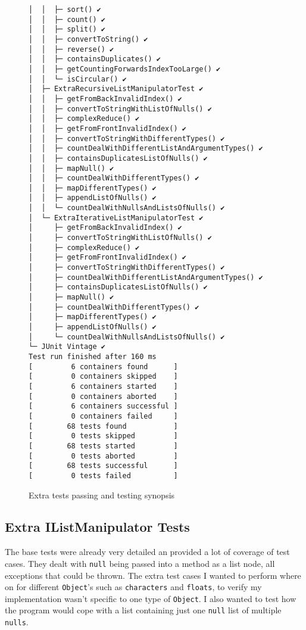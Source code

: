 \documentclass{article}
\begin{document}
\begin{figure}[H]
\centering \begin{BVerbatim}[fontsize=\small]
│  │  ├─ sort() ✔
│  │  ├─ count() ✔
│  │  ├─ split() ✔
│  │  ├─ convertToString() ✔
│  │  ├─ reverse() ✔
│  │  ├─ containsDuplicates() ✔
│  │  ├─ getCountingForwardsIndexTooLarge() ✔
│  │  └─ isCircular() ✔
│  ├─ ExtraRecursiveListManipulatorTest ✔
│  │  ├─ getFromBackInvalidIndex() ✔
│  │  ├─ convertToStringWithListOfNulls() ✔
│  │  ├─ complexReduce() ✔
│  │  ├─ getFromFrontInvalidIndex() ✔
│  │  ├─ convertToStringWithDifferentTypes() ✔
│  │  ├─ countDealWithDifferentListAndArgumentTypes() ✔
│  │  ├─ containsDuplicatesListOfNulls() ✔
│  │  ├─ mapNull() ✔
│  │  ├─ countDealWithDifferentTypes() ✔
│  │  ├─ mapDifferentTypes() ✔
│  │  ├─ appendListOfNulls() ✔
│  │  └─ countDealWithNullsAndListsOfNulls() ✔
│  └─ ExtraIterativeListManipulatorTest ✔
│     ├─ getFromBackInvalidIndex() ✔
│     ├─ convertToStringWithListOfNulls() ✔
│     ├─ complexReduce() ✔
│     ├─ getFromFrontInvalidIndex() ✔
│     ├─ convertToStringWithDifferentTypes() ✔
│     ├─ countDealWithDifferentListAndArgumentTypes() ✔
│     ├─ containsDuplicatesListOfNulls() ✔
│     ├─ mapNull() ✔
│     ├─ countDealWithDifferentTypes() ✔
│     ├─ mapDifferentTypes() ✔
│     ├─ appendListOfNulls() ✔
│     └─ countDealWithNullsAndListsOfNulls() ✔
└─ JUnit Vintage ✔
Test run finished after 160 ms
[         6 containers found      ]
[         0 containers skipped    ]
[         6 containers started    ]
[         0 containers aborted    ]
[         6 containers successful ]
[         0 containers failed     ]
[        68 tests found           ]
[         0 tests skipped         ]
[        68 tests started         ]
[         0 tests aborted         ]
[        68 tests successful      ]
[         0 tests failed          ]

\end{BVerbatim}
\caption{Extra tests passing and testing synopsis}
\label{extra_tests}
\end{figure}

\subsection{Extra IListManipulator Tests}
The base tests were already very detailed an provided a lot of coverage of test cases. They dealt with \verb+null+ being passed into a method as a list node, all exceptions that could be thrown. The extra test cases I wanted to perform where on for different \verb+Object+'s such as \verb+characters+ and \verb+floats+, to verify my implementation wasn't specific to one type of \verb+Object+. I also wanted to test how the program would cope with a list containing just one \verb+null+ list of multiple \verb+nulls+.
\end{document}
